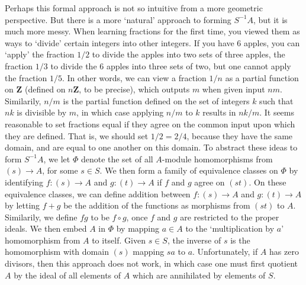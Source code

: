
Perhaps this formal approach is not so intuitive from a more geometric perspective. But there is a more `natural' approach to forming $S^{-1}A$, but it is much more messy. When learning fractions for the first time, you viewed them as ways to `divide' certain integers into other integers. If you have 6 apples, you can `apply' the fraction $1/2$ to divide the apples into two sets of three apples, the fraction $1/3$ to divide the 6 apples into three sets of two, but one cannot apply the fraction $1/5$. In other words, we can view a fraction $1/n$ as a partial function on $\mathbf{Z}$ (defined on $n \mathbf{Z}$, to be precise), which outputs $m$ when given input $nm$. Similarily, $n/m$ is the partial function defined on the set of integers $k$ such that $nk$ is divisible by $m$, in which case applying $n/m$ to $k$ results in $nk/m$. It seems reasonable to set fractions equal if they agree on the common input upon which they are defined. That is, we should set $1/2 = 2/4$, because they have the same domain, and are equal to one another on this domain. To abstract these ideas to form $S^{-1}A$, we let $\Phi$ denote the set of all $A$-module homomorphisms from $(s) \to A$, for some $s \in S$. We then form a family of equivalence classes on $\Phi$ by identifying $f: (s) \to A$ and $g: (t) \to A$ if $f$ and $g$ agree on $(st)$. On these equivalence classes, we can define addition between $f: (s) \to A$ and $g: (t) \to A$ by letting $f + g$ be the addition of the functions as morphisms from $(st)$ to $A$. Similarily, we define $fg$ to be $f \circ g$, once $f$ and $g$ are restricted to the proper ideals. We then embed $A$ in $\Phi$ by mapping $a \in A$ to the `multiplication by $a$' homomorphism from $A$ to itself. Given $s \in S$, the inverse of $s$ is the homomorphism with domain $(s)$ mapping $sa$ to $a$. Unfortunately, if $A$ has zero divisors, then this approach does not work, in which case one must first quotient $A$ by the ideal of all elements of $A$ which are annihilated by elements of $S$.

